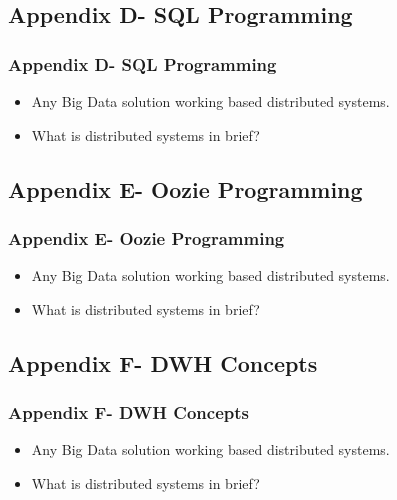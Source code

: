 
\subsection{Appendix D- SQL Programming}
\begin{frame}
\frametitle{Appendix D- SQL Programming}
\begin{itemize}[<+->]
	\item Any Big Data solution working based distributed systems.
	\item What is distributed systems in brief?
\end{itemize}
\end{frame}


\subsection{Appendix E- Oozie Programming}
\begin{frame}
\frametitle{Appendix E- Oozie Programming}
\begin{itemize}[<+->]
	\item Any Big Data solution working based distributed systems.
	\item What is distributed systems in brief?
\end{itemize}
\end{frame}


\subsection{Appendix F- DWH Concepts}
\begin{frame}
\frametitle{Appendix F- DWH Concepts}
\begin{itemize}[<+->]
	\item Any Big Data solution working based distributed systems.
	\item What is distributed systems in brief?
\end{itemize}
\end{frame}

